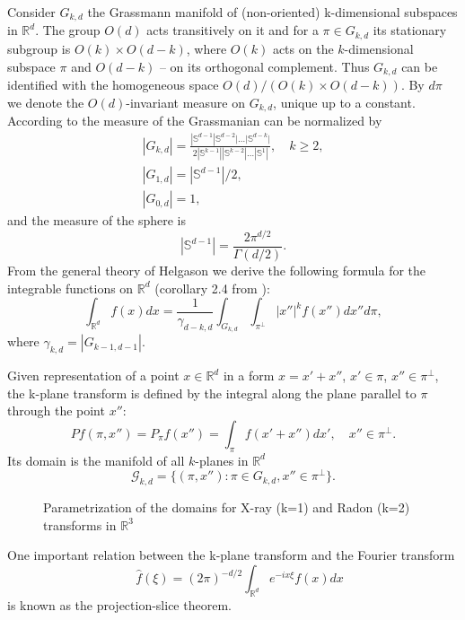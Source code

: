 \documentclass[12pt]{iopart}
\begin{document}
	Consider $G_{k,d}$ the Grassmann manifold of (non-oriented) k-dimensional subspaces in $\mathbb R^d$. The group $O(d)$ acts transitively on it and for a $\pi\in G_{k,d}$ its stationary subgroup is $O(k)\times O(d-k)$, where $O(k)$ acts on the $k$-dimensional subspace $\pi$ and $O(d-k)$ -- on its orthogonal complement. Thus $G_{k,d}$ can be identified with the homogeneous space $O(d)/(O(k)\times O(d-k))$. By $d\pi$ we denote the $O(d)$-invariant measure on $G_{k,d}$, unique up to a constant.  According to \cite{Sa} the measure of the Grassmanian can be normalized by
	\begin{eqnarray*}
		|G_{k,d}|=\frac{|\mathbb S^{d-1}|\mathbb S^{d-2}|\dots|\mathbb S^{d-k}|}{2|\mathbb S^{k-1}||\mathbb S^{k-2}|\dots|\mathbb S^1|},\quad k\geqslant2,\\
		|G_{1,d}|=|\mathbb S^{d-1}|/2,\\
		|G_{0,d}|=1,
	\end{eqnarray*}
	and the measure of the sphere is
	$$
	|\mathbb S^{d-1}|=\frac{2\pi^{d/2}}{\Gamma(d/2)}.
	$$
	From the general theory of Helgason \cite{H} we derive the following formula for the integrable functions on $\mathbb R^d$ (corollary 2.4 from \cite{K}):
	\begin{equation}
	\label{integral}
	\int_{\mathbb R^d}f(x)dx=\frac{1}{\gamma_{d-k,d}}\int_{G_{k,d}}\int_{\pi^\perp}|x''|^kf(x'')dx''d\pi,
	\end{equation}
	where
	$
	\gamma_{k,d}=|G_{k-1,d-1}|.
	$
	
	Given representation of a point $x\in\mathbb R^d$ in a form $x=x'+x''$, $x'\in\pi$, $x''\in\pi^\perp$, the k-plane transform is defined by the integral along the plane parallel to $\pi$ through the point $x''$:
	$$Pf(\pi,x'')=P_\pi f(x'')=\int_{\pi}f(x'+x'')dx',\quad x''\in\pi^\perp.$$
	Its domain is the manifold of all $k$-planes in $\mathbb R^d$ 
	$$\mathcal G_{k,d}=\{(\pi,x''):\pi\in G_{k,d}, x''\in\pi^\perp\}.$$
	
	\begin{figure}[h]
		\caption{Parametrization of the domains for X-ray (k=1) and Radon (k=2) transforms in $\mathbb R^3$}
		\label{some example}
	\end{figure}
	One important relation between the k-plane transform and the Fourier transform
	$$\quad \widehat f(\xi)=(2\pi)^{-d/2}\int_{\mathbb R^d}e^{-ix\xi}f(x)dx$$
	is  known as the projection-slice theorem. 
	
\end{document}
